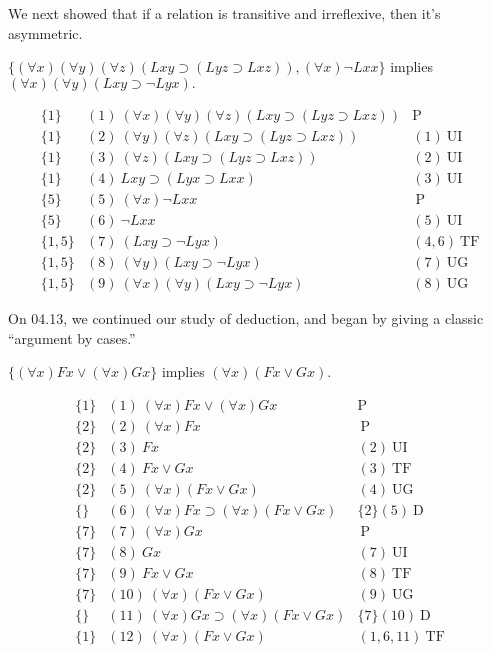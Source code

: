 \iffalse
We next showed that if a relation is transitive and irreflexive, then it's asymmetric.
\begin{center}
$\{(\forall x)(\forall y)(\forall z)(Lxy\supset(Lyz\supset Lxz)), (\forall x)\neg Lxx\}$ implies $(\forall x)(\forall y)(Lxy\supset\neg Lyx).$
\end{center}
\[
\begin{array}{lll}
\{1\}   & (1)\  (\forall x)(\forall y)(\forall z)(Lxy\supset(Lyz\supset Lxz)) &  \mathrm{P}\\
\{1\}   & (2)\ (\forall y)(\forall z)(Lxy\supset(Lyz\supset Lxz)) & (1) \ \mathrm{UI}\\
\{1\}   & (3)\ (\forall z)(Lxy\supset(Lyz\supset Lxz)) &  (2)\ \mathrm{UI}\\
\{1\}   & (4)\ Lxy\supset(Lyx\supset Lxx)   & (3)\ \mathrm{UI}\\
\{5\}   & (5)\ (\forall x) \neg Lxx  & \ \mathrm{P}\\
\{5\}   & (6)\ \neg Lxx  & (5)\ \mathrm{UI}\\
\{1,5\}   & (7)\ (Lxy\supset\neg Lyx)  & (4,6)\ \mathrm{TF}\\
\{1,5\}   & (8)\ (\forall y)(Lxy\supset\neg Lyx)  & (7)\ \mathrm{UG}\\
\{1,5\}   & (9)\ (\forall x)(\forall y)(Lxy\supset\neg Lyx)  & (8)\ \mathrm{UG}
\end{array}
\]

On 04.13, we continued our study of deduction, and began by giving a classic ``argument by cases.''
\begin{center}
$\{(\forall x)Fx\vee(\forall x)Gx\}$ implies $(\forall x)(Fx\vee Gx).$
\end{center}
\[
\begin{array}{lll}
\{1\}   & (1)\  (\forall x)Fx\vee(\forall x)Gx &  \mathrm{P}\\
\{2\}   & (2)\ (\forall x)Fx &  \ \mathrm{P}\\
\{2\}   & (3)\ Fx &  (2)\ \mathrm{UI}\\
\{2\}   & (4)\ Fx\vee Gx   & (3)\ \mathrm{TF}\\
\{2\}   & (5)\ (\forall x) (Fx\vee Gx)  & (4)\ \mathrm{UG}\\
\{\}   & (6)\ (\forall x)Fx\supset(\forall x) (Fx\vee Gx)   & \{2\}(5)\ \mathrm{D}\\
\{7\}   & (7)\ (\forall x)Gx &  \ \mathrm{P}\\
\{7\}   & (8)\ Gx &  (7)\ \mathrm{UI}\\
\{7\}   & (9)\ Fx\vee Gx   & (8)\ \mathrm{TF}\\
\{7\}   & (10)\ (\forall x) (Fx\vee Gx)  & (9)\ \mathrm{UG}\\
\{\}   & (11)\ (\forall x)Gx\supset(\forall x) (Fx\vee Gx)   & \{7\}(10)\ \mathrm{D}\\
\{1\}   & (12)\ (\forall x) (Fx\vee Gx)  & (1,6,11)\ \mathrm{TF}\\
\end{array}
\]

